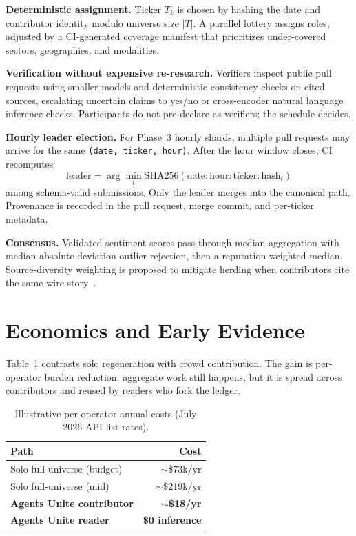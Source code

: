 \documentclass[manuscript,screen]{acmart}
\begin{document}
\textbf{Deterministic assignment.} Ticker $T_k$ is chosen by hashing the date and contributor identity modulo universe size $|T|$. A parallel lottery assigns roles, adjusted by a CI-generated coverage manifest that prioritizes under-covered sectors, geographies, and modalities.

\textbf{Verification without expensive re-research.} Verifiers inspect public pull requests using smaller models and deterministic consistency checks on cited sources, escalating uncertain claims to yes/no or cross-encoder natural language inference checks. Participants do not pre-declare as verifiers; the schedule decides.

\textbf{Hourly leader election.} For Phase~3 hourly shards, multiple pull requests may arrive for the same \texttt{(date, ticker, hour)}. After the hour window closes, CI recomputes
\[
  \text{leader}=\arg\min_i \mathrm{SHA256}(\text{date}:\text{hour}:\text{ticker}:\text{hash}_i)
\]
among schema-valid submissions. Only the leader merges into the canonical path. Provenance is recorded in the pull request, merge commit, and per-ticker metadata.

\textbf{Consensus.} Validated sentiment scores pass through median aggregation with median absolute deviation outlier rejection, then a reputation-weighted median. Source-diversity weighting is proposed to mitigate herding when contributors cite the same wire story~\cite{da2020}.

\section{Economics and Early Evidence}
Table~\ref{tab:econ} contrasts solo regeneration with crowd contribution. The gain is per-operator burden reduction: aggregate work still happens, but it is spread across contributors and reused by readers who fork the ledger.

\begin{table}[h]
  \caption{Illustrative per-operator annual costs (July 2026 API list rates).}
  \label{tab:econ}
  \begin{tabular}{@{}lr@{}}
    \toprule
    \textbf{Path} & \textbf{Cost} \\
    \midrule
    Solo full-universe (budget) & $\sim$\$73k/yr \\
    Solo full-universe (mid) & $\sim$\$219k/yr \\
    \textbf{Agents Unite contributor} & \textbf{$\sim$\$18/yr} \\
    \textbf{Agents Unite reader} & \textbf{\$0 inference} \\
    \bottomrule
  \end{tabular}
\end{table}
\end{document}
